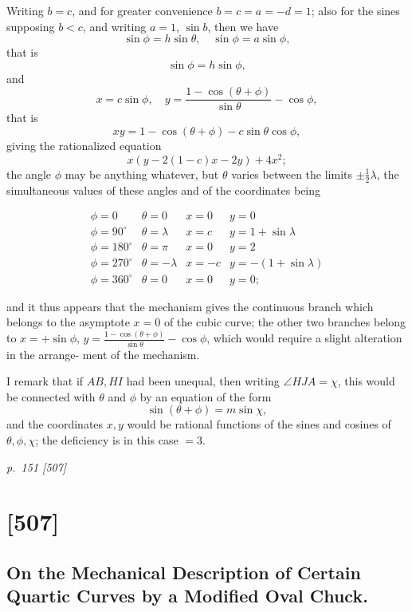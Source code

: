 \documentclass[11pt,a4paper]{book}
\begin{document}
\noindent
Writing $b = c$, and for greater convenience $b = c = a = -d = 1$; also for the sines
supposing $b < c$, and writing $a = 1$, $\sin b$, then we have
\[
\sin\phi = h\sin\theta, \quad\sin\phi = a\sin\phi,
\]
that is
\[
\sin\phi = h\sin\phi,
\]
and
\[
x = c\sin\phi,\quad y = \frac{1 - \cos(\theta + \phi)}{\sin\theta} - \cos\phi,
\]
that is
\[
xy = 1 - \cos(\theta + \phi) - c\sin\theta\cos\phi,
\]
giving the rationalized equation
\[
x\left(y - 2(1 - c)x - 2y\right) + 4x^2;
\]
the angle $\phi$ may be anything whatever, but $\theta$ varies between the limits $\pm\tfrac{1}{2}\lambda$, the
simultaneous values of these angles and of the coordinates being

\[
\begin{array}{cccc}
\phi = 0 & \theta = 0 & x = 0 & y = 0\\
\phi = 90^\circ & \theta = \lambda & x = c & y = 1 + \sin\lambda\\
\phi = 180^\circ & \theta = \pi & x = 0 & y = 2\\
\phi = 270^\circ & \theta = -\lambda & x = -c & y = -(1 + \sin\lambda)\\
\phi = 360^\circ & \theta = 0 & x = 0 & y = 0;
\end{array}
\]

and it thus appears that the mechanism gives the continuous branch which belongs
to the asymptote $x = 0$ of the cubic curve; the other two branches belong to
$x = +\sin\phi$, $y = \frac{1 - \cos(\theta + \phi)}{\sin\theta} - \cos\phi$, which would require a slight alteration in the arrange-
ment of the mechanism.

I remark that if $AB, HI$ had been unequal, then writing $\angle HJA = \chi$, this would
be connected with $\theta$ and $\phi$ by an equation of the form
\[
\sin(\theta + \phi) = m\sin\chi,
\]
and the coordinates $x, y$ would be rational functions of the sines and cosines of
$\theta, \phi, \chi$; the deficiency is in this case $= 3$.

\clearpage

\bigskip
\textit{p.~151 [507]}
\smallskip

\section{[507]}
\subsection{On the Mechanical Description of Certain Quartic Curves by a Modified Oval Chuck.}
\end{document}
